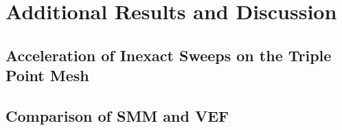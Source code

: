 \documentclass[../doc.tex]{subfiles}
\begin{document}
\chapter{Additional Results and Discussion}
\section{Acceleration of Inexact Sweeps on the Triple Point Mesh}

\section{Comparison of SMM and VEF}
\end{document}
